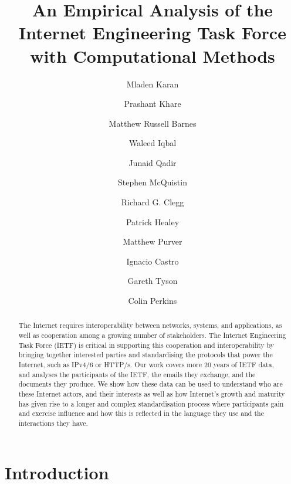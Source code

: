 \documentclass[twocolumn,10pt]{article}
\begin{document}
\title{An Empirical Analysis of the Internet Engineering Task Force 
       with Computational Methods}
\author{Mladen Karan \and
        Prashant Khare \and
        Matthew Russell Barnes \and
        Waleed Iqbal \and
        Junaid Qadir \and
        Stephen McQuistin \and
        Richard G. Clegg \and
        Patrick Healey \and
        Matthew Purver \and
        Ignacio Castro \and
        Gareth Tyson \and
        Colin Perkins}

\maketitle
\begin{abstract}

  The Internet requires interoperability between networks, systems, and
  applications, as well as cooperation among a growing number of
  stakeholders. The Internet Engineering Task Force (IETF) is critical in
  supporting this cooperation and interoperability by bringing together
  interested parties and standardising the protocols that power the
  Internet, such as IPv4/6 or HTTP/s. Our work covers more 20 years of IETF
  data, and analyses the participants of the IETF, the emails they
  exchange, and the documents they produce. We show how these data can be
  used to understand who are these Internet actors, and their interests as
  well as how Internet's growth and maturity has given rise to a longer and
  complex standardisation process where participants gain and exercise
  influence and how this is reflected in the language they use and the
  interactions they have.
  

\end{abstract}
\section{Introduction}

%
\end{document}
